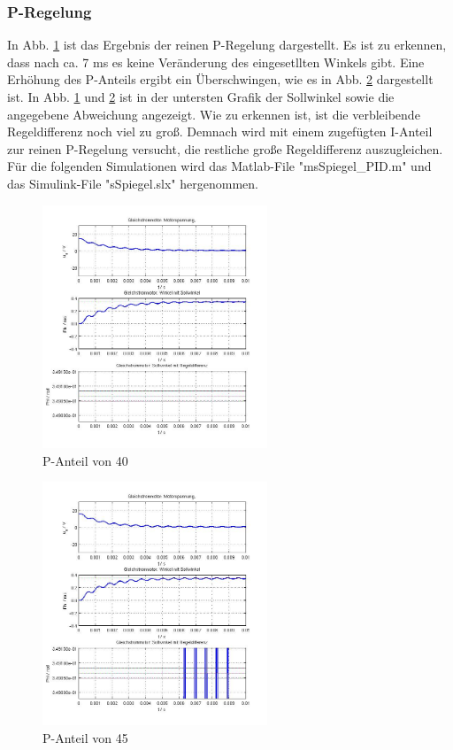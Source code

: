 \subsubsection{P-Regelung}
\label{chap:p_regelung}
In Abb. \ref{fig:p40} ist das Ergebnis der reinen P-Regelung dargestellt. 
Es ist zu erkennen, dass nach ca. 7 ms es keine Veränderung des eingesetllten Winkels gibt. 
Eine Erhöhung des P-Anteils ergibt ein Überschwingen, wie es in Abb. \ref{fig:p45} dargestellt ist.
In Abb. \ref{fig:p40} und \ref{fig:p45} ist in der untersten Grafik der Sollwinkel sowie die angegebene Abweichung angezeigt. 
Wie zu erkennen ist, ist die verbleibende Regeldifferenz noch viel zu groß. 
Demnach wird mit einem zugefügten I-Anteil zur reinen P-Regelung versucht, die restliche große Regeldifferenz auszugleichen. 
Für die folgenden Simulationen wird das Matlab-File "msSpiegel_PID.m" und das Simulink-File "sSpiegel.slx" hergenommen.
\begin{figure}[!h]
	\centering
	\includegraphics[width=0.6\textwidth]{NurP40.jpg}
	\caption{P-Anteil von 40}
	\label{fig:p40}
\end{figure}
\begin{figure}[!h]
	\centering
	\includegraphics[width=0.6\textwidth]{NurP45.jpg}
	\caption{P-Anteil von 45}
	\label{fig:p45}
\end{figure}

